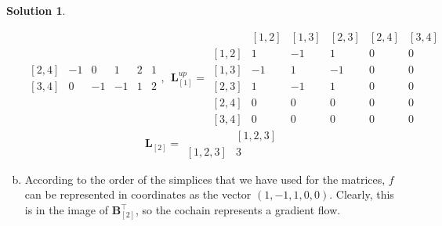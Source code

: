 \documentclass{article}
\theoremstyle{plain}
\theoremstyle{definition}
\newtheorem*{sol*}{Solution}
\begin{document}
\begin{sol*}
\begin{enumerate}[(a)]
\[\begin{matrix}
[2, 4]&   -1     &     0     &     1    &    2     &    1\\
[3, 4]&   0     &     -1     &     -1     &    1     &    2
\end{matrix},\ \
\mathbf{L}_{[1]}^{up} = \begin{matrix}
  & [1, 2] &   [1, 3] &    [2, 3] &    [2, 4] &   [3, 4] \\
[1,2]&  1     &    -1     &     1    &    0     &    0   \\
[1,3]&   -1     &    1   &    -1     &   0     &    0   \\
[2,3]&   1    &     -1     &     1     &    0     &   0   \\
[2, 4]&   0    &     0     &     0   &    0     &    0\\
[3, 4]&   0     &     0    &    0     &    0     &    0
\end{matrix}
\]
\[
\mathbf{L}_{[2]}=\begin{matrix}
& [1,2,3]\\
[1,2,3] & 3
\end{matrix}
\]
\item According to the order of the simplices that we have used for the matrices, $f$ can be represented in coordinates as the vector $(1, -1,1,0,0)$. Clearly, this is in the image of $\mathbf{B}_{[2]}^{\top}$, so the cochain represents a gradient flow.
\end{enumerate}
\end{sol*}
\end{document}
